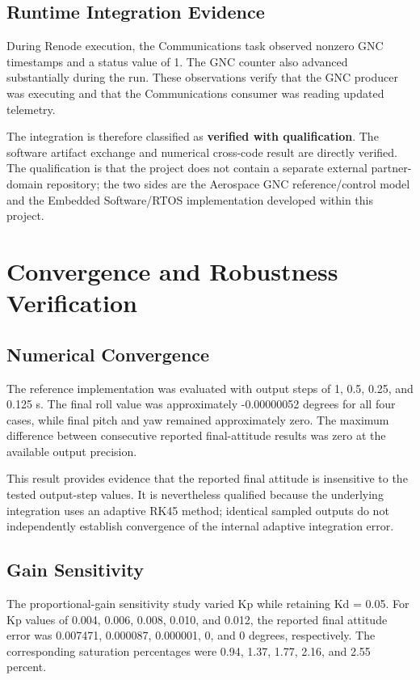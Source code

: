 \documentclass[11pt,a4paper]{article}
\begin{document}
\subsection{Runtime Integration Evidence}

During Renode execution, the Communications task observed nonzero GNC timestamps and a status value of 1. The GNC counter also advanced substantially during the run. These observations verify that the GNC producer was executing and that the Communications consumer was reading updated telemetry.

The integration is therefore classified as \textbf{verified with qualification}. The software artifact exchange and numerical cross-code result are directly verified. The qualification is that the project does not contain a separate external partner-domain repository; the two sides are the Aerospace GNC reference/control model and the Embedded Software/RTOS implementation developed within this project.


\section{Convergence and Robustness Verification}

\subsection{Numerical Convergence}

The reference implementation was evaluated with output steps of 1, 0.5, 0.25, and 0.125 s. The final roll value was approximately -0.00000052 degrees for all four cases, while final pitch and yaw remained approximately zero. The maximum difference between consecutive reported final-attitude results was zero at the available output precision.

This result provides evidence that the reported final attitude is insensitive to the tested output-step values. It is nevertheless qualified because the underlying integration uses an adaptive RK45 method; identical sampled outputs do not independently establish convergence of the internal adaptive integration error.

\subsection{Gain Sensitivity}

The proportional-gain sensitivity study varied Kp while retaining Kd = 0.05. For Kp values of 0.004, 0.006, 0.008, 0.010, and 0.012, the reported final attitude error was 0.007471, 0.000087, 0.000001, 0, and 0 degrees, respectively. The corresponding saturation percentages were 0.94, 1.37, 1.77, 2.16, and 2.55 percent.
\end{document}
